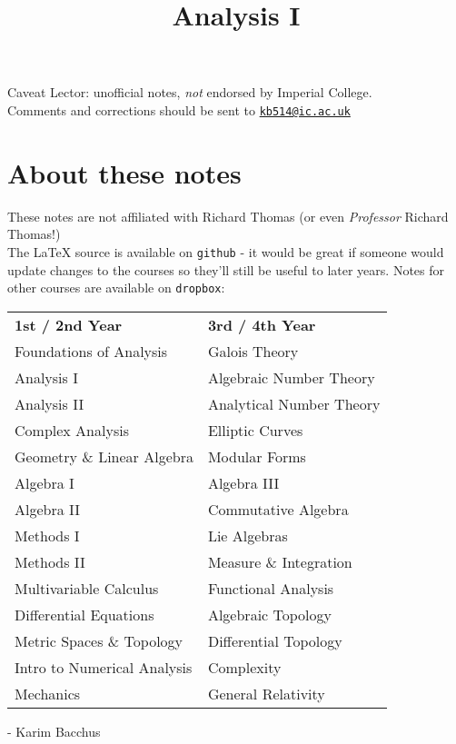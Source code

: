 \documentclass[twoside]{scrartcl}
\title{Analysis I}
\begin{document}
{
Caveat Lector: unofficial notes, \emph{not} endorsed by Imperial College.\\[0.1cm]
Comments and corrections should be sent to \href{mailto:kb514@ic.ac.uk}{\texttt{kb514@ic.ac.uk}}
}
{

\section*{About these notes}

These notes are not affiliated with Richard Thomas (or even \emph{Professor} Richard Thomas!)\\ The \LaTeX{} source is available on \texttt{github} - it would be great if someone would update changes to the courses so they'll still be useful to later years. Notes for other courses are available on \texttt{dropbox}:

\begin{center}
\begin{tabular}{l | l}
\textbf{1st / 2nd Year} & \textbf{3rd / 4th Year}\\
Foundations of Analysis & Galois Theory\\
Analysis I & Algebraic Number Theory \\
Analysis II & Analytical Number Theory \\
Complex Analysis & Elliptic Curves  \\
Geometry \& Linear Algebra & Modular Forms \\
Algebra I & Algebra III \\
Algebra II & Commutative Algebra \\
Methods I & Lie Algebras  \\
Methods II & Measure \& Integration  \\
Multivariable Calculus & Functional Analysis\\
Differential Equations & Algebraic Topology \\
Metric Spaces \& Topology  & Differential Topology \\
Intro to Numerical Analysis & Complexity \\
Mechanics & General Relativity \\
\end{tabular}
\end{center}

\begin{flushright}
- Karim Bacchus 	
\end{flushright}



}
\end{document}
